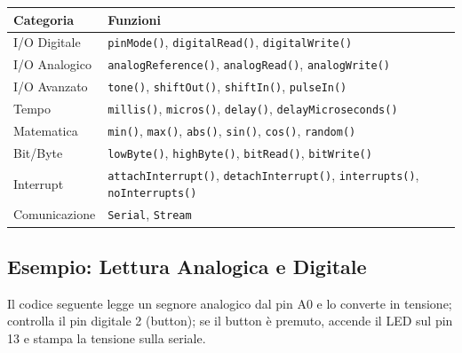 \documentclass[
  italian,
  openany]{book}
\newcounter{none} %
\begin{document}
{\def\LTcaptype{none} %
\begin{longtable}[]{@{}
  >{\raggedright\arraybackslash}p{}
  >{\raggedright\arraybackslash}p{}@{}}
\toprule\noalign{}
\begin{minipage}[b]{\linewidth}\raggedright
Categoria
\end{minipage} & \begin{minipage}[b]{\linewidth}\raggedright
Funzioni
\end{minipage} \\
\midrule\noalign{}
\endhead
\bottomrule\noalign{}
\endlastfoot
I/O Digitale & \texttt{pinMode()}, \texttt{digitalRead()},
\texttt{digitalWrite()} \\
I/O Analogico & \texttt{analogReference()}, \texttt{analogRead()},
\texttt{analogWrite()} \\
I/O Avanzato & \texttt{tone()}, \texttt{shiftOut()}, \texttt{shiftIn()},
\texttt{pulseIn()} \\
Tempo & \texttt{millis()}, \texttt{micros()}, \texttt{delay()},
\texttt{delayMicroseconds()} \\
Matematica & \texttt{min()}, \texttt{max()}, \texttt{abs()},
\texttt{sin()}, \texttt{cos()}, \texttt{random()} \\
Bit/Byte & \texttt{lowByte()}, \texttt{highByte()}, \texttt{bitRead()},
\texttt{bitWrite()} \\
Interrupt & \texttt{attachInterrupt()}, \texttt{detachInterrupt()},
\texttt{interrupts()}, \texttt{noInterrupts()} \\
Comunicazione & \texttt{Serial}, \texttt{Stream} \\
\end{longtable}
}

\subsection{Esempio: Lettura Analogica e
Digitale}\label{esempio-lettura-analogica-e-digitale}

Il codice seguente legge un segnore analogico dal pin A0 e lo converte
in tensione; controlla il pin digitale 2 (button); se il button è
premuto, accende il LED sul pin 13 e stampa la tensione sulla seriale.
\end{document}
